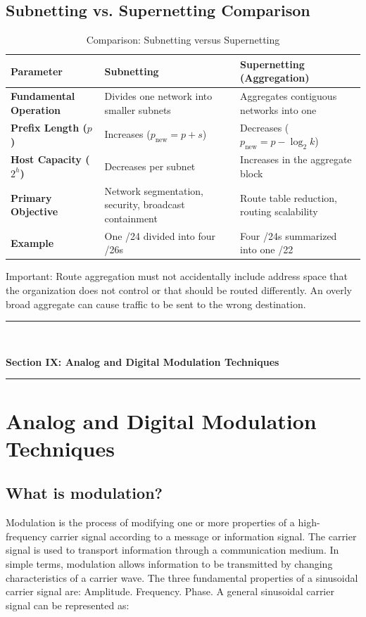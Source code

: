 \subsection{Subnetting vs. Supernetting Comparison}
\begin{table}[htbp]
\centering
\caption{Comparison: Subnetting versus Supernetting}
\label{tab:subnetting_vs_supernetting}
\begin{tabularx}{\textwidth}{p{3.8cm} X X}
\toprule
\textbf{Parameter} & \textbf{Subnetting} & \textbf{Supernetting (Aggregation)} \\
\midrule
\textbf{Fundamental Operation} & Divides one network into smaller subnets & Aggregates contiguous networks into one \\
\textbf{Prefix Length ($p$)} & Increases ($p_{\text{new}} = p + s$) & Decreases ($p_{\text{new}} = p - \log_2 k$) \\
\textbf{Host Capacity ($2^h$)} & Decreases per subnet & Increases in the aggregate block \\
\textbf{Primary Objective} & Network segmentation, security, broadcast containment & Route table reduction, routing scalability \\
\textbf{Example} & One /24 divided into four /26s & Four /24s summarized into one /22 \\
\bottomrule
\end{tabularx}
\end{table}
Important: Route aggregation must not accidentally include address space that the organization does not control or that should be routed differently. An overly broad aggregate can cause traffic to be sent to the wrong destination.

\newpage

\newpage
\begin{center}
\vspace{0.5em}
{\color{primary}\rule{0.45\textwidth}{1.2pt}\\[4pt]}
{\Large\bfseries\color{primary} Section IX: Analog and Digital Modulation Techniques\\[2pt]}
{\color{primary}\rule{0.45\textwidth}{1.2pt}}
\vspace{0.5em}
\end{center}

\section{Analog and Digital Modulation Techniques}

\subsection{What is modulation?}
Modulation is the process of modifying one or more properties of a high-frequency carrier signal according to a message or information signal.
The carrier signal is used to transport information through a communication medium.
In simple terms, modulation allows information to be transmitted by changing characteristics of a carrier wave.
The three fundamental properties of a sinusoidal carrier signal are:
Amplitude.
Frequency.
Phase.
A general sinusoidal carrier signal can be represented as:

